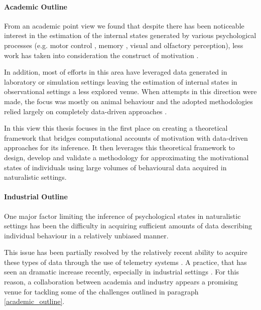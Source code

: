 \paragraph*{Academic Outline}
\label{academic_outline}
From an academic point view we found that despite there has been noticeable interest in the estimation of the internal states generated by various psychological processes (e.g. motor control \cite{gallego2017neural}, memory \cite{derdikman2011manifold, nieh2021geometry}, visual \cite{seung2000manifold, ganmor2015thesaurus} and olfactory \cite{stopfer2003intensity} perception), less work has taken into consideration the construct of motivation \cite{mcclure2003computational, zhang2009neural}. 

In addition, most of efforts in this area have leveraged data generated in laboratory or simulation settings \cite{eyjolfsdottir2016learning, song2017reward, merel2019deep,calhoun2019unsupervised, seung2000manifold, pang2016dimensionality, luxem2020identifying, pereira2020quantifying, mccullough2021unsupervised, shi2021learning} leaving the estimation of internal states in observational settings a less explored venue. When attempts in this direction were made, the focus was mostly on animal behaviour and the adopted methodologies relied largely on completely data-driven approaches \cite{luxem2020identifying,pereira2020quantifying, mccullough2021unsupervised}. 

In this view this thesis focuses in the first place on creating a theoretical framework that bridges   computational accounts of motivation with data-driven approaches for its inference. It then leverages this theoretical framework to design, develop and validate a methodology for approximating the motivational states of individuals using large volumes of behavioural data acquired in naturalistic settings. 

\paragraph*{Industrial Outline}
\label{industrial_outline}
One major factor limiting the inference of psychological states in naturalistic settings has been the difficulty in acquiring sufficient amounts of data describing individual behaviour in a relatively unbiased manner. 

This issue has been partially resolved by the relatively recent ability to acquire these types of data through the use of telemetry systems \cite{el2016game, drachen2015behavioral}. A practice, that has seen an dramatic increase recently, especially in industrial settings \cite{el2016game, drachen2015behavioral,EUdataregulations2018}. For this reason, a collaboration between academia and industry appears a promising venue for tackling some of the challenges outlined in paragraph \ref{academic_outline}. 

